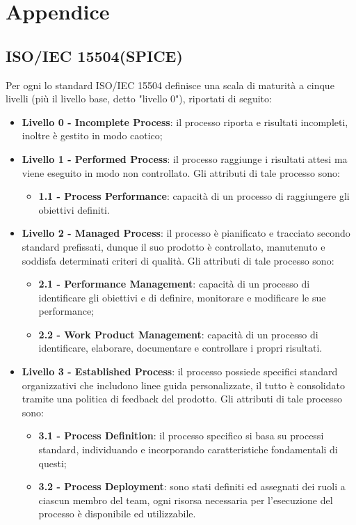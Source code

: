 \section{Appendice}
\subsection{ISO/IEC 15504(SPICE)}
Per ogni  lo standard ISO/IEC 15504 definisce una scala di maturità a cinque livelli (più il livello base, detto "livello 0"), riportati di seguito:
\begin{itemize}
	\item \textbf {Livello 0 - Incomplete Process}: il processo riporta  e risultati incompleti, inoltre è gestito in modo caotico;
	\item \textbf {Livello 1 - Performed Process}:  il processo raggiunge i risultati attesi ma viene eseguito in modo non controllato. Gli attributi di tale processo sono:
	\begin{itemize}
		\item \textbf{1.1 - Process Performance}: capacità di un processo di raggiungere gli obiettivi definiti.
	\end{itemize}
	\item \textbf {Livello 2 - Managed Process}: il processo è pianificato e tracciato secondo standard prefissati, dunque il suo prodotto è controllato, manutenuto e soddisfa determinati criteri di qualità. Gli attributi di tale processo sono:
	\begin{itemize}
		\item \textbf{2.1 - Performance Management}: capacità di un processo di identificare gli obiettivi e di definire, monitorare e modificare le sue performance;
		\item \textbf{2.2 - Work Product Management}: capacità di un processo di identificare, elaborare, documentare e controllare i propri risultati.
	\end{itemize}
	\item \textbf {Livello 3 - Established Process}: il processo possiede specifici standard organizzativi che includono linee guida personalizzate, il tutto è consolidato tramite una politica di feedback del prodotto. Gli attributi di tale processo sono:
	\begin{itemize}
		\item \textbf{3.1 - Process Definition}: il processo specifico si basa su processi standard, individuando e incorporando caratteristiche fondamentali di questi;
		\item \textbf{3.2 - Process Deployment}: sono stati definiti ed assegnati dei ruoli a ciascun membro del team, ogni risorsa necessaria per l'esecuzione del processo è disponibile ed utilizzabile.

\end{itemize}
\end{itemize}
